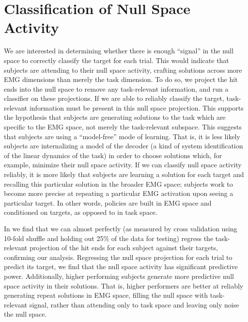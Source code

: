 \documentclass[../main.tex]{subfiles}
\begin{document}
  
  \section{Classification of Null Space Activity}
  
     We are interested in determining whether there is enough ``signal'' in the null space to correctly classify the target for each trial. This would indicate that subjects are attending to their null space activity, crafting solutions across more EMG dimensions than merely the task dimension. To do so, we project the hit ends into the null space to remove any task-relevant information, and run a classifier on these projections. If we are able to reliably classify the target, task-relevant information must be present in this null space projection. This supports the hypothesis that subjects are generating solutions to the task which are specific to the EMG space, not merely the task-relevant subspace. This suggests that subjects are using a ``model-free'' mode of learning. That is, it is less likely subjects are internalizing a model of the decoder (a kind of system identification of the linear dynamics of the task) in order to choose solutions which, for example, minimize their null space activity. If we can classify null space activity reliably, it is more likely that subjects are learning a solution for each target and recalling this particular solution in the broader EMG space; subjects work to become more precise at repeating a particular EMG activation upon seeing a particular target. In other words, policies are built in EMG space and conditioned on targets, as opposed to in task space.
     

     
     In  we find that we can almost perfectly (as measured by cross validation using 10-fold shuffle and holding out 25\% of the data for testing) regress the task-relevant projection of the hit ends for each subject against their targets, confirming our analysis. Regressing the null space projection for each trial to predict its target, we find that the null space activity has significant predictive power. Additionally, higher performing subjects generate more predictive null space activity in their solutions. That is, higher performers are better at reliably generating repeat solutions in EMG space, filling the null space with task-relevant signal, rather than attending only to task space and leaving only noise the null space.
     
\end{document}
